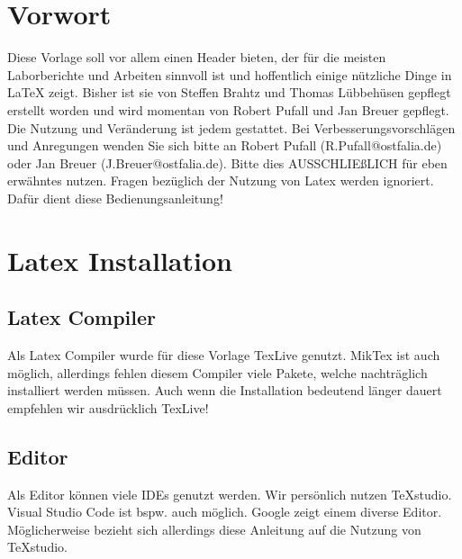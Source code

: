 	
	
	
	
	\tableofcontents
	\newpage
	\section{Vorwort}
	Diese Vorlage soll vor allem einen Header bieten, der für die meisten Laborberichte und Arbeiten sinnvoll ist und hoffentlich einige nützliche Dinge in LaTeX zeigt.\newline
	Bisher ist sie von Steffen Brahtz und Thomas Lübbehüsen gepflegt erstellt worden und wird momentan von Robert Pufall und Jan Breuer gepflegt.\newline
	Die Nutzung und Veränderung ist jedem gestattet. Bei Verbesserungsvorschlägen und Anregungen wenden Sie sich bitte an Robert Pufall (R.Pufall@ostfalia.de) oder Jan Breuer (J.Breuer@ostfalia.de).
	Bitte dies AUSSCHLIEßLICH für eben erwähntes nutzen. Fragen bezüglich der Nutzung von Latex werden ignoriert. Dafür dient diese Bedienungsanleitung!
	
	
	\section{Latex Installation}
	\subsection{Latex Compiler}
	Als Latex Compiler wurde für diese Vorlage TexLive genutzt. MikTex ist auch möglich, allerdings fehlen diesem Compiler viele Pakete, welche nachträglich installiert werden müssen.\newline
	Auch wenn die Installation bedeutend länger dauert empfehlen wir ausdrücklich TexLive!
	\subsection{Editor}
	Als Editor können viele IDEs genutzt werden. Wir persönlich nutzen TeXstudio. Visual Studio Code ist bspw. auch möglich. Google zeigt einem diverse Editor. Möglicherweise bezieht sich allerdings diese Anleitung auf die Nutzung von TeXstudio. 
	
